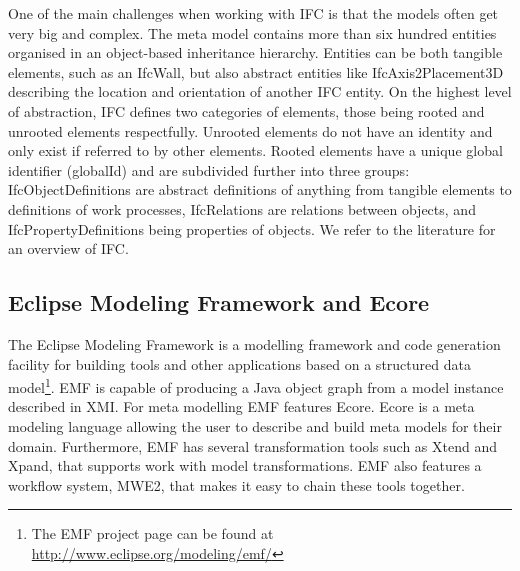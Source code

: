 One of the main challenges when working with IFC is that the models often get very big and complex. The meta model contains more than six hundred entities organised in an object-based inheritance hierarchy. Entities can be both tangible elements, such as an IfcWall, but also abstract entities like IfcAxis2Placement3D describing the location and orientation of another IFC entity. On the highest level of abstraction, IFC defines two categories of elements, those being rooted and unrooted elements respectfully. Unrooted elements do not have an identity and only exist if referred to by other elements. Rooted elements have a unique global identifier (globalId) and are subdivided further into three groups: IfcObjectDefinitions are abstract definitions of anything from tangible elements to definitions of work processes, IfcRelations are relations between objects, and IfcPropertyDefinitions being properties of objects. We refer to the literature for an overview of IFC.

\subsection{Eclipse Modeling Framework and Ecore}
The Eclipse Modeling Framework is a modelling framework and code generation facility for building tools and other applications based on a structured data model\footnote{The EMF project page can be found at \url{http://www.eclipse.org/modeling/emf/}}. EMF is capable of producing a Java object graph from a model instance described in XMI. For meta modelling EMF features Ecore. Ecore is a meta modeling language allowing the user to describe and build meta models for their domain. Furthermore, EMF has several transformation tools such as Xtend and Xpand, that supports work with model transformations. EMF also features a workflow system, MWE2, that makes it easy to chain these tools together.
